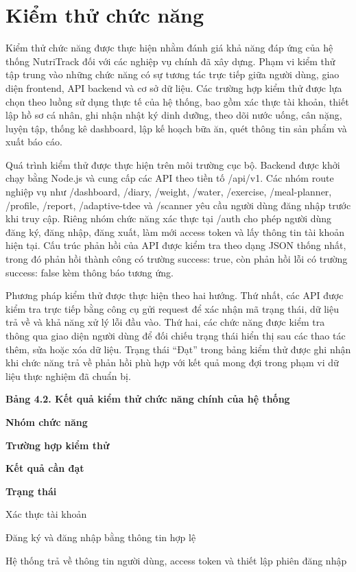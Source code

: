 \documentclass[12pt, a4paper]{report}
\begin{document}
\section{Kiểm thử chức năng}Kiểm thử chức năng được thực hiện nhằm đánh giá khả năng đáp ứng của hệ thống NutriTrack đối với các nghiệp vụ chính đã xây dựng. Phạm vi kiểm thử tập trung vào những chức năng có sự tương tác trực tiếp giữa người dùng, giao diện frontend, API backend và cơ sở dữ liệu. Các trường hợp kiểm thử được lựa chọn theo luồng sử dụng thực tế của hệ thống, bao gồm xác thực tài khoản, thiết lập hồ sơ cá nhân, ghi nhận nhật ký dinh dưỡng, theo dõi nước uống, cân nặng, luyện tập, thống kê dashboard, lập kế hoạch bữa ăn, quét thông tin sản phẩm và xuất báo cáo.

Quá trình kiểm thử được thực hiện trên môi trường cục bộ. Backend được khởi chạy bằng Node.js và cung cấp các API theo tiền tố /api/v1. Các nhóm route nghiệp vụ như /dashboard, /diary, /weight, /water, /exercise, /meal-planner, /profile, /report, /adaptive-tdee và /scanner yêu cầu người dùng đăng nhập trước khi truy cập. Riêng nhóm chức năng xác thực tại /auth cho phép người dùng đăng ký, đăng nhập, đăng xuất, làm mới access token và lấy thông tin tài khoản hiện tại. Cấu trúc phản hồi của API được kiểm tra theo dạng JSON thống nhất, trong đó phản hồi thành công có trường success: true, còn phản hồi lỗi có trường success: false kèm thông báo tương ứng.

Phương pháp kiểm thử được thực hiện theo hai hướng. Thứ nhất, các API được kiểm tra trực tiếp bằng công cụ gửi request để xác nhận mã trạng thái, dữ liệu trả về và khả năng xử lý lỗi đầu vào. Thứ hai, các chức năng được kiểm tra thông qua giao diện người dùng để đối chiếu trạng thái hiển thị sau các thao tác thêm, sửa hoặc xóa dữ liệu. Trạng thái “Đạt” trong bảng kiểm thử được ghi nhận khi chức năng trả về phản hồi phù hợp với kết quả mong đợi trong phạm vi dữ liệu thực nghiệm đã chuẩn bị.

\textbf{Bảng 4.2. Kết quả kiểm thử chức năng chính của hệ thống}

\textbf{Nhóm chức năng}

\textbf{Trường hợp kiểm thử}

\textbf{Kết quả cần đạt}

\textbf{Trạng thái}

Xác thực tài khoản

Đăng ký và đăng nhập bằng thông tin hợp lệ

Hệ thống trả về thông tin người dùng, access token và thiết lập phiên đăng nhập
\end{document}
